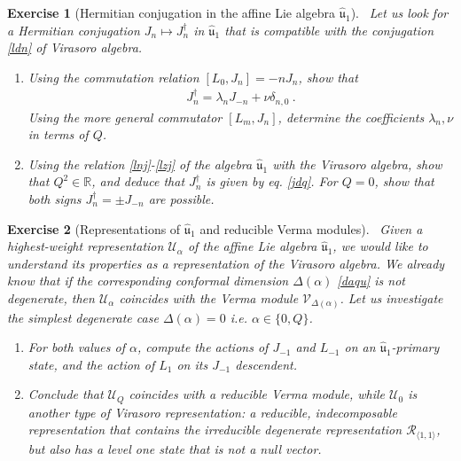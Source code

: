 \documentclass[12pt, a4paper, notitlepage, twoside]{report}
\numberwithin{equation}{section}
\theoremstyle{break}
\newtheorem{exo}{Exercise}[chapter]
\begin{document}
\begin{exo}[Hermitian conjugation in the affine Lie algebra $\hat{\mathfrak{u}}_1$]
~\label{exocuo}
Let us look for a Hermitian conjugation $J_n\mapsto J_n^\dagger$ in $\hat{\mathfrak{u}}_1$ that is compatible with the conjugation \eqref{ldn} of Virasoro algebra.
\begin{enumerate}
 \item Using the commutation relation $[L_0,J_n]=-nJ_n$, show that 
 \begin{align}
  J_n^\dagger =\lambda_n J_{-n} + \nu\delta_{n,0}\ .
 \end{align}
Using the more general commutator $[L_m,J_n]$, determine the coefficients $\lambda_n,\nu$ in terms of $Q$. 
\item 
Using the relation \eqref{lnj}-\eqref{lzj} of the algebra $\hat{\mathfrak{u}}_1$ with the Virasoro algebra, show that $Q^2\in\mathbb{R}$, and deduce that $J_n^\dagger$ is given by eq. \eqref{jdq}. For $Q=0$, show that both signs $J_n^\dagger = \pm J_{-n}$ are possible.
\end{enumerate}

\end{exo}

\begin{exo}[Representations of $\hat{\mathfrak{u}}_1$  and reducible Verma modules]
 ~\label{exoazq}
Given a highest-weight representation $\mathcal{U}_\alpha$ of the affine Lie algebra $\hat{\mathfrak{u}}_1$, we would like to understand its properties as a representation of the Virasoro algebra. We already know that if the corresponding conformal dimension $\Delta(\alpha)$ \eqref{daqu} is not degenerate, then $\mathcal{U}_\alpha$ coincides with the Verma module $\mathcal{V}_{\Delta(\alpha)}$. Let us investigate the simplest degenerate case $\Delta(\alpha)=0$ i.e. $\alpha\in\{0, Q\}$. 
\begin{enumerate}
 \item For both values of $\alpha$, compute the actions of $J_{-1}$ and $L_{-1}$ on an $\hat{\mathfrak{u}}_1$-primary state, and the action of $L_1$ on its $J_{-1}$ descendent. 
 \item Conclude that $\mathcal{U}_Q$ coincides with a reducible Verma module, while $\mathcal{U}_0$ is another type of Virasoro representation: a reducible, indecomposable representation that contains the irreducible degenerate representation $\mathcal{R}_{\langle 1,1\rangle}$, but also has a level one state that is not a null vector.
\end{enumerate}

 
\end{exo}
\end{document}
